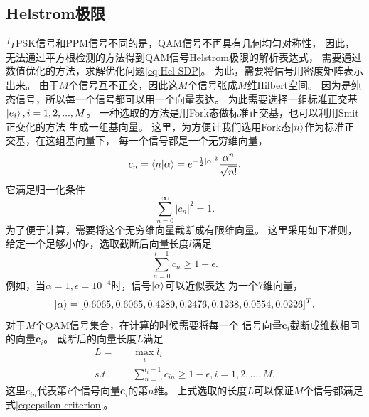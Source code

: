 \subsection{Helstrom极限}
与PSK信号和PPM信号不同的是，QAM信号不再具有几何均匀对称性，
因此，无法通过平方根检测的方法得到QAM信号Helstrom极限的解析表达式，
需要通过数值优化的方法，求解优化问题\ref{eq:Hel-SDP}。
为此，需要将信号用密度矩阵表示出来。
由于$M$个信号互不正交，因此这$M$个信号张成$M$维Hilbert空间。
因为是纯态信号，所以每一个信号都可以用一个向量表达。
为此需要选择一组标准正交基$\ket{e_i}, i=1,2,...,M$。
一种选取的方法是用Fork态做标准正交基，也可以利用Smit正交化的方法
生成一组基向量\cite{zxd2004matrix}。
这里，为方便计我们选用Fork态$\ket{n}$作为标准正交基，在这组基向量下，
每一个信号都是一个无穷维向量，
\begin{equation}
c_n = \bra{n}\ket{\alpha} = e^{-\frac{1}{2}|\alpha|^2} \frac{\alpha^n}{\sqrt{n!}}.
\end{equation}
它满足归一化条件
\begin{equation}
\sum_{n=0}^{\infty} |c_n|^2 = 1.
\end{equation}
为了便于计算，需要将这个无穷维向量截断成有限维向量。
这里采用如下准则，给定一个足够小的$\epsilon$，选取截断后向量长度$l$满足
\begin{equation}
\sum_{n=0}^{l-1} c_n \ge 1 - \epsilon.
\label{eq:epsilon-criterion}
\end{equation}
例如，当$\alpha=1, \epsilon=10^{-4}$时，信号$\ket{\alpha}$可以近似表达
为一个7维向量，
\begin{equation}
\ket{\alpha} = [0.6065, \\
    0.6065, \\
    0.4289, \\
    0.2476, \\
    0.1238, \\
    0.0554, \\
    0.0226]^T.
\end{equation}
对于$M$个QAM信号集合，在计算的时候需要将每一个
信号向量$\bm{c}_i$截断成维数相同的向量$\tilde{\bm{c}}_i$。
截断后的向量长度$L$满足
\begin{equation}
\begin{split}
L = \quad  & \max_i l_i  \\
s.t. \quad &\sum_{n=0}^{l_i-1} c_{in} \ge 1 - \epsilon, i=1,2,...,M.
\end{split}
\end{equation}
这里$c_{in}$代表第$i$个信号向量$\bm{c}_i$的第$n$维。
上式选取的长度$L$可以保证$M$个信号都满足式\ref{eq:epsilon-criterion}。

